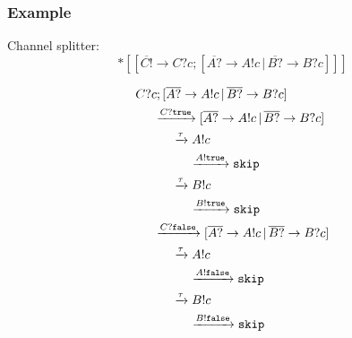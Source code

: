 \documentclass[compress]{beamer}
\begin{document}
\begin{frame}
    \frametitle{Example}
    Channel splitter:
    {\small $$*[[\overline{C!} \rightarrow C?c; [\overline{A?} \rightarrow A!c \, | \, \overline{B?} \rightarrow B?c]]]$$}
\end{frame}
\begin{frame}
    \small
    \begin{align*}
        & C?c; [\overline{A?} \rightarrow A!c \, | \, \overline{B?} \rightarrow B?c] \\
        & \hspace{0.5cm} \xrightarrow{C?\mathtt{true}} [\overline{A?} \rightarrow A!c \, | \, \overline{B?} \rightarrow B?c] \\
        & \hspace{1.0cm} \xrightarrow{\tau} A!c \\
        & \hspace{1.5cm} \xrightarrow{A!\mathtt{true}} \mathtt{skip} \\
        & \hspace{1.0cm} \xrightarrow{\tau} B!c \\
        & \hspace{1.5cm} \xrightarrow{B!\mathtt{true}} \mathtt{skip} \\
        & \hspace{0.5cm} \xrightarrow{C?\mathtt{false}} [\overline{A?} \rightarrow A!c \, | \, \overline{B?} \rightarrow B?c] \\
        & \hspace{1.0cm} \xrightarrow{\tau} A!c \\
        & \hspace{1.5cm} \xrightarrow{A!\mathtt{false}} \mathtt{skip} \\
        & \hspace{1.0cm} \xrightarrow{\tau} B!c \\
        & \hspace{1.5cm} \xrightarrow{B!\mathtt{false}} \mathtt{skip}
    \end{align*}
\end{frame}
\end{document}
